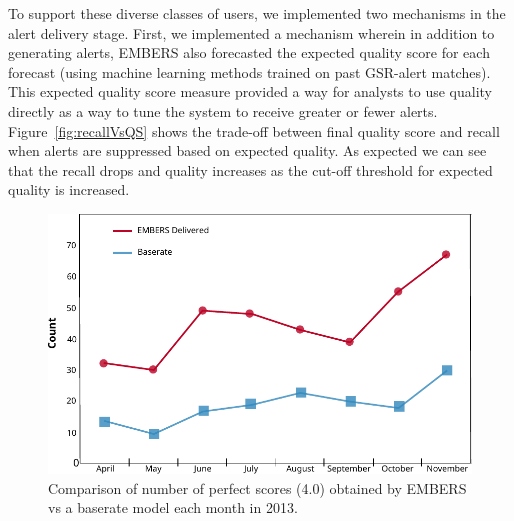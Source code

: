 To support these diverse classes of users, we implemented two
mechanisms in the alert delivery stage. First, we implemented a mechanism wherein in addition to generating alerts, EMBERS
also forecasted the expected quality score for each forecast (using machine learning methods trained on
past GSR-alert matches). This expected quality score measure provided a way for analysts to use quality
directly as a way to tune the system to receive greater or fewer
alerts.  Figure~\ref{fig:recallVsQS} shows the trade-off between final quality
score and recall when alerts are suppressed based on expected quality.
As expected we can see that the recall drops and quality increases as 
the cut-off threshold for expected quality is increased.

\begin{figure}[t]
\includegraphics[width=\columnwidth]{figures/cu/perf_figures.pdf}
\caption{Comparison of number of perfect scores (4.0) obtained by EMBERS vs 
a baserate model each month in 2013.}
\label{fig:perfect_score}
\end{figure}

